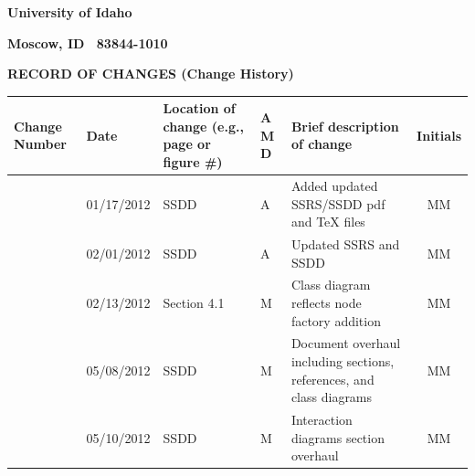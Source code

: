 \documentclass[twoside,letterpaper]{article}
\begin{document}
{\centering\bfseries University of Idaho \par}

{\centering\bfseries Moscow, ID \ 83844-1010 \par}






{\centering{}\bfseries\color{black}
RECORD OF CHANGES (Change History)
\par}



\begin{flushleft}
\tablehead{}
\begin{supertabular}[c]{|m{0.75in}|m{1.0in}|m{1.5in}|m{0.25in}|m{2in}|c|}
\hline

\centering \bfseries Change
\centering \bfseries Number
&

\centering \bfseries Date
\par
&

\centering \bfseries Location of change\newline
\centering \bfseries(e.g., page or figure \#)
&

\centering \bfseries A\newline
\centering \bfseries M\newline
\centering \bfseries D  
&

\centering \bfseries Brief description\newline
\centering \bfseries of change
&
\bfseries Initials

\\\hline
{}
& 01/17/2012
& SSDD
& \centering A
& Added updated SSRS/SSDD pdf and TeX files
& MM

\\\hline
{}
& 02/01/2012
& SSDD 
& \centering A
& Updated SSRS and SSDD
& MM

\\\hline
{}
& 02/13/2012
& Section 4.1
& \centering M
& Class diagram reflects node factory addition
& MM

\\\hline
{}
& 05/08/2012
& SSDD
& \centering M
& Document overhaul including sections, references, and class diagrams
& MM

\\\hline
{}
& 05/10/2012
& SSDD
& \centering M
& Interaction diagrams section overhaul
& MM

\\\hline
\end{supertabular}
\end{flushleft}
\end{document}
